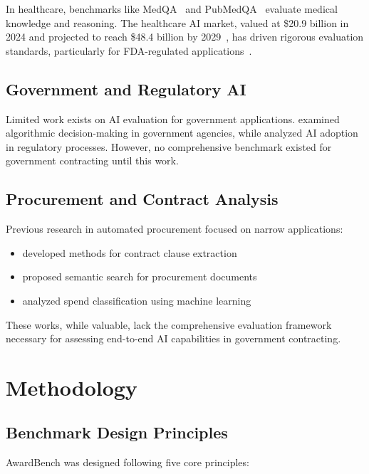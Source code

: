 \documentclass[11pt,a4paper]{article}
\begin{document}
In healthcare, benchmarks like MedQA~\citep{jin2021disease} and PubMedQA~\citep{jin2019pubmedqa} evaluate medical knowledge and reasoning. The healthcare AI market, valued at \$20.9 billion in 2024 and projected to reach \$48.4 billion by 2029~\citep{marketsandmarkets2024}, has driven rigorous evaluation standards, particularly for FDA-regulated applications~\citep{fda2024ai}.

\subsection{Government and Regulatory AI}

Limited work exists on AI evaluation for government applications. \citet{engstrom2020government} examined algorithmic decision-making in government agencies, while \citet{coglianese2024administrative} analyzed AI adoption in regulatory processes. However, no comprehensive benchmark existed for government contracting until this work.

\subsection{Procurement and Contract Analysis}

Previous research in automated procurement focused on narrow applications:
\begin{itemize}
    \item \citet{wang2019automated} developed methods for contract clause extraction
    \item \citet{hendler2023semantic} proposed semantic search for procurement documents
    \item \citet{reis2024procurement} analyzed spend classification using machine learning
\end{itemize}

These works, while valuable, lack the comprehensive evaluation framework necessary for assessing end-to-end AI capabilities in government contracting.

\section{Methodology}

\subsection{Benchmark Design Principles}

AwardBench was designed following five core principles:
\end{document}
